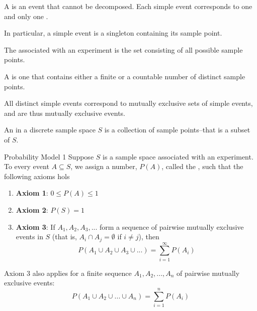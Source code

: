 \documentclass[12pt, a4paper, twoside, openright, titlepage]{book}
\begin{document}
\begin{defn}{}{}
    A  is an event that cannot be decomposed. Each simple event corresponds to one and only one . 

    In particular, a simple event is a singleton containing its sample point.
\end{defn}


\begin{defn}{}{}
    The  associated with an experiment is the set consisting of all possible sample points.
\end{defn}


\begin{defn}{}{}
    A  is one that contains either a finite or a countable number of distinct sample points.
\end{defn}


\begin{rmk}{}{}
    All distinct simple events correspond to mutually exclusive sets of simple events, and are thus mutually exclusive events.
\end{rmk}

\begin{defn}{}{}
    An  in a discrete sample space $S$ is a collection of sample points\---that is a subset of $S$.
\end{defn}

\begin{defn}{Probability Model 1}{}
    Suppose $S$ is a sample space associated with an experiment. To every event $A \subseteq S$, we assign a number, $P(A)$, called the , such that the following axioms hols \begin{enumerate}
        \item[] \textbf{Axiom 1}: $0 \leq P(A) \leq 1$
        \item[] \textbf{Axiom 2}: $P(S) = 1$
        \item[] \textbf{Axiom 3}: If $A_1,A_2,A_3,...$ form a sequence of pairwise mutually exclusive events in $S$ (that is, $A_i\cap A_j =\emptyset$ if $i \neq j$), then \begin{equation}
                P(A_1\cup A_2\cup A_3\cup ...) = \sum\limits_{i=1}^{\infty}P(A_i)
        \end{equation}
    \end{enumerate}
    Axiom 3 also applies for a finite sequence $A_1,A_2,...,A_n$ of pairwise mutually exclusive events:\begin{equation}
        P(A_1\cup A_2\cup ... \cup A_n) = \sum\limits_{i=1}^nP(A_i)
    \end{equation}
\end{defn}
\end{document}
